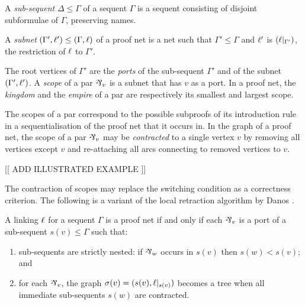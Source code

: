 \documentclass[conference]{IEEEtran}
\begin{document}
\begin{definition}
A \emph{sub-sequent} $\Delta\leq\Gamma$ of a sequent $\Gamma$ is a sequent consisting of disjoint subformulae of $\Gamma$, preserving names.
\end{definition}


\begin{definition}
A \emph{subnet} $(\Gamma',\ell') \leq (\Gamma,\ell)$ of a proof net is a net such that $\Gamma'\leq\Gamma$ and $\ell'$ is $(\ell|_{\Gamma'})$, the restriction of $\ell$ to $\Gamma'$.
\end{definition}


The root vertices of $\Gamma'$ are the \emph{ports} of the sub-sequent $\Gamma'$ and of the subnet $(\Gamma',\ell')$.
%
A \emph{scope} of a par $\named v\parr$ is a subnet that has $v$ as a port.
%
In a proof net, the \emph{kingdom} and the \emph{empire} of a par are respectively its smallest and largest scope.



The scopes of a par correspond to the possible subproofs of its introduction rule in a sequentialisation of the proof net that it occurs in.
%
In the graph of a proof net, the scope of a par $\named v\parr$ may be \emph{contracted} to a single vertex $v$ by removing all vertices except $v$ and re-attaching all arcs connecting to removed vertices to $v$.
%

[[ ADD ILLUSTRATED EXAMPLE ]]

%
The contraction of scopes may replace the switching condition as a correctness criterion.
%
The following is a variant of the local retraction algorithm by Danos \cite{Danos-1990}.


\begin{proposition}
\label{prop:scoping correctness}
A linking $\ell$ for a sequent $\Gamma$ is a proof net if and only if each $\named v\parr$ is a port of a sub-sequent $s(v)\leq\Gamma$ such that:

\begin{enumerate}
	\item
sub-sequents are strictly nested: if $\named w\parr$ occurs in $s(v)$ then $s(w)<s(v)$; and
	\item
for each $\named v\parr$, the graph $\sigma(v)=(s(v),\ell|_{s(v)})$ becomes a tree when all immediate sub-sequents $s(w)$ are contracted.
\end{enumerate}

\end{proposition}
\end{document}
